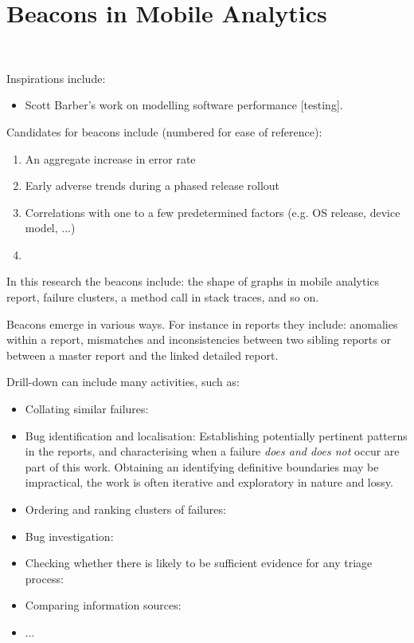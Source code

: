 \section{Beacons in Mobile Analytics}~\label{beacons-in-mobile-analytics}

Inspirations include:
\begin{itemize}
    \item Scott Barber's work on modelling software performance [testing].
\end{itemize}

Candidates for beacons include (numbered for ease of reference):
\begin{enumerate}
    \item An aggregate increase in error rate
    \item Early adverse trends during a phased release rollout
    \item Correlations with one to a few predetermined factors (e.g. OS release, device model, ...)
    \item 
\end{enumerate}

In this research the beacons include: the shape of graphs in mobile analytics report, failure clusters, a method call in stack traces, and so on.


Beacons emerge in various ways. For instance in reports they include: anomalies within a report, mismatches and inconsistencies between two sibling reports or between a master report and the linked detailed report.


Drill-down can include many activities, such as:
 
 \begin{itemize}
    \itemsep0em
    \item Collating similar failures: 
    \item Bug identification and localisation: Establishing potentially pertinent patterns in the reports, and characterising when a failure \emph{does and does not} occur are part of this work. Obtaining an identifying definitive boundaries may be impractical, the work is often iterative and exploratory in nature and lossy. 
    \item Ordering and ranking clusters of failures:
    \item Bug investigation:
    \item Checking whether there is likely to be sufficient evidence for any triage process: 
    \item Comparing information sources:
    \item ...
\end{itemize}
